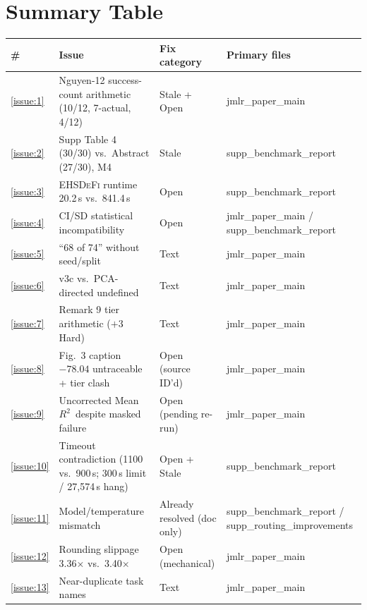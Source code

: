 \documentclass[11pt]{article}
\newcommand{\rtwo}{$R^2$}
\newcommand{\EHD}{\textsc{EHSDeFi}}
\begin{document}
\section*{Summary Table}
\begin{longtable}{p{1.2cm}p{6.7cm}p{2.2cm}p{2.8cm}}
\toprule
\textbf{\#} & \textbf{Issue} & \textbf{Fix category} & \textbf{Primary files} \\
\midrule
\endhead
\ref{issue:1} & Nguyen-12 success-count arithmetic (10/12, 7-actual, 4/12) & Stale + Open & jmlr\_paper\_main \\
\ref{issue:2} & Supp Table 4 (30/30) vs.\ Abstract (27/30), M4 & Stale & supp\_benchmark\_report \\
\ref{issue:3} & \EHD{} runtime 20.2\,s vs.\ 841.4\,s & Open & supp\_benchmark\_report \\
\ref{issue:4} & CI/SD statistical incompatibility & Open & jmlr\_paper\_main / supp\_benchmark\_report \\
\ref{issue:5} & ``68 of 74'' without seed/split & Text & jmlr\_paper\_main \\
\ref{issue:6} & v3c vs.\ PCA-directed undefined & Text & jmlr\_paper\_main \\
\ref{issue:7} & Remark 9 tier arithmetic ($+3$ Hard) & Text & jmlr\_paper\_main \\
\ref{issue:8} & Fig.\ 3 caption $-78.04$ untraceable + tier clash & Open (source ID'd) & jmlr\_paper\_main \\
\ref{issue:9} & Uncorrected Mean \rtwo\ despite masked failure & Open (pending re-run) & jmlr\_paper\_main \\
\ref{issue:10} & Timeout contradiction (1100 vs.\ 900\,s; 300\,s limit / 27{,}574\,s hang) & Open + Stale & supp\_benchmark\_report \\
\ref{issue:11} & Model/temperature mismatch & Already resolved (doc only) & supp\_benchmark\_report / supp\_routing\_improvements \\
\ref{issue:12} & Rounding slippage 3.36$\times$ vs.\ 3.40$\times$ & Open (mechanical) & jmlr\_paper\_main \\
\ref{issue:13} & Near-duplicate task names & Text & jmlr\_paper\_main \\
\bottomrule
\end{longtable}
\end{document}
